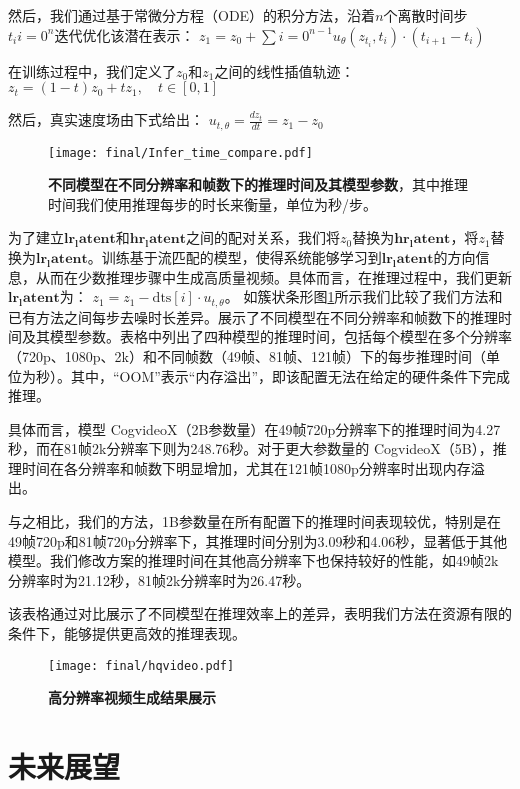 然后，我们通过基于常微分方程（ODE）的积分方法，沿着$n$个离散时间步${t_i}{i=0}^n$迭代优化该潜在表示：
$z_1 = z_0 + \sum{i=0}^{n-1} u_\theta(z_{t_i}, t_i) \cdot (t_{i+1} - t_i)$

在训练过程中，我们定义了$z_0$和$z_1$之间的线性插值轨迹：
$z_t = (1 - t) z_0 + t z_1, \quad t \in [0,1]$

然后，真实速度场由下式给出：
$u_{t,\theta} = \frac{dz_t}{dt} = z_1 - z_0$
\begin{figure}[htbp]
    \centering
    \texttt{[image: final/Infer\_time\_compare.pdf]}
    \caption{\textbf{不同模型在不同分辨率和帧数下的推理时间及其模型参数}，其中推理时间我们使用推理每步的时长来衡量，单位为秒/步。
    }
    \label{fig:time_size}
\end{figure}
为了建立$\mathbf{lr_latent}$和$\mathbf{hr_latent}$之间的配对关系，我们将$z_0$替换为$\mathbf{hr_latent}$，将$z_1$替换为$\mathbf{lr_latent}$。训练基于流匹配的模型，使得系统能够学习到$\mathbf{lr_latent}$的方向信息，从而在少数推理步骤中生成高质量视频。具体而言，在推理过程中，我们更新$\mathbf{lr_latent}$为：
$z_1 = z_1 - \text{dts}[i] \cdot u_{t,\theta}$。 如簇状条形图\cref{fig:time_size}所示我们比较了我们方法和已有方法之间每步去噪时长差异。展示了不同模型在不同分辨率和帧数下的推理时间及其模型参数。表格中列出了四种模型的推理时间，包括每个模型在多个分辨率（720p、1080p、2k）和不同帧数（49帧、81帧、121帧）下的每步推理时间（单位为秒）。其中，“OOM”表示“内存溢出”，即该配置无法在给定的硬件条件下完成推理。

具体而言，模型 CogvideoX（2B参数量）在49帧720p分辨率下的推理时间为4.27秒，而在81帧2k分辨率下则为248.76秒。对于更大参数量的 CogvideoX（5B），推理时间在各分辨率和帧数下明显增加，尤其在121帧1080p分辨率时出现内存溢出。

与之相比，我们的方法，1B参数量在所有配置下的推理时间表现较优，特别是在49帧720p和81帧720p分辨率下，其推理时间分别为3.09秒和4.06秒，显著低于其他模型。我们修改方案的推理时间在其他高分辨率下也保持较好的性能，如49帧2k分辨率时为21.12秒，81帧2k分辨率时为26.47秒。

该表格通过对比展示了不同模型在推理效率上的差异，表明我们方法在资源有限的条件下，能够提供更高效的推理表现。

\begin{figure}[htbp]
    \centering
    \texttt{[image: final/hqvideo.pdf]}
    \caption{
        \textbf{高分辨率视频生成结果展示}
    }
    \label{hqvideo}
\end{figure}

\section{未来展望}

